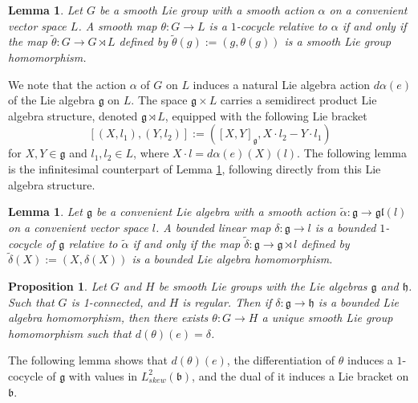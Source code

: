 \documentclass[11pt,reqno]{amsart}
\newtheorem{lemma}[theorem]{Lemma}
\newtheorem{proposition}[theorem]{Proposition}
\theoremstyle{definition}
\numberwithin{equation}{section}
\begin{document}
\begin{lemma}\label{4.4}
Let $G$ be a smooth Lie group with a smooth action $\alpha$ on a convenient vector space $L$. A smooth map $\theta: G \rightarrow L$ is a $1$-cocycle relative to $\alpha$ if and only if the map $\tilde{\theta}: G \rightarrow G \rtimes L$ defined by $\tilde{\theta}(g) := (g, \theta(g))$ is a smooth Lie group homomorphism.
\end{lemma}

We note that the action $\alpha$ of $G$ on $L$ induces a natural Lie algebra action $d\alpha(e)$ of the Lie algebra $\mathfrak{g}$ on $L$. The space $\mathfrak{g} \times L$ carries a semidirect product Lie algebra structure, denoted $\mathfrak{g} \rtimes L$, equipped with the following Lie bracket
\[
[(X, l_1), (Y, l_2)] := ([X, Y]_{\mathfrak{g}}, X \cdot l_2 - Y \cdot l_1)
\]
for $X, Y \in \mathfrak{g}$ and $l_1, l_2 \in L$, where $X \cdot l = d\alpha(e)(X)(l)$. The following lemma is the infinitesimal counterpart of Lemma \ref{4.4}, following directly from this Lie algebra structure.

\begin{lemma}\label{4.5}
Let $\mathfrak{g}$ be a convenient Lie algebra with a smooth action $\tilde{\alpha}: \mathfrak{g} \to \mathfrak{gl}(l)$ on a convenient vector space $l$. A bounded linear map $\delta: \mathfrak{g} \rightarrow l$ is a bounded $1$-cocycle of $\mathfrak{g}$ relative to $\tilde{\alpha}$ if and only if the map $\tilde{\delta}: \mathfrak{g} \rightarrow \mathfrak{g} \rtimes l$ defined by $\tilde{\delta}(X) := (X, \delta(X))$ is a bounded Lie algebra homomorphism.
\end{lemma}
\begin{proposition}\cite[Theorem 7.3]{22}\label{proposition 4.10}
Let $G$ and $H$ be smooth Lie groups with the Lie algebras $\mathfrak{g}$ and $\mathfrak{h}$. Such that $G$ is 1-connected, and $H$ is regular. Then if $\delta: \mathfrak{g} \rightarrow \mathfrak{h}$ is a bounded Lie algebra homomorphism, then there exists $\theta: G \rightarrow H$ a unique smooth Lie group homomorphism such that $d(\theta)(e) = \delta$.
\end{proposition}



The following lemma shows that $d(\theta)(e)$, the differentiation of $\theta$ induces a $1$-cocycle of $\mathfrak{g}$ with values in $L^2_{skew}(\mathfrak{b})$, and the dual of it induces a Lie bracket on $\mathfrak{b}$.
\end{document}

